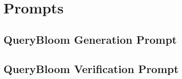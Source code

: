 \section{Prompts}
\label{sec:appendix_prompt}
\subsection{QueryBloom Generation Prompt}
\label{sec:appendix_prompt_generate}


\subsection{QueryBloom Verification Prompt}
\label{sec:appendix_prompt_verify}
